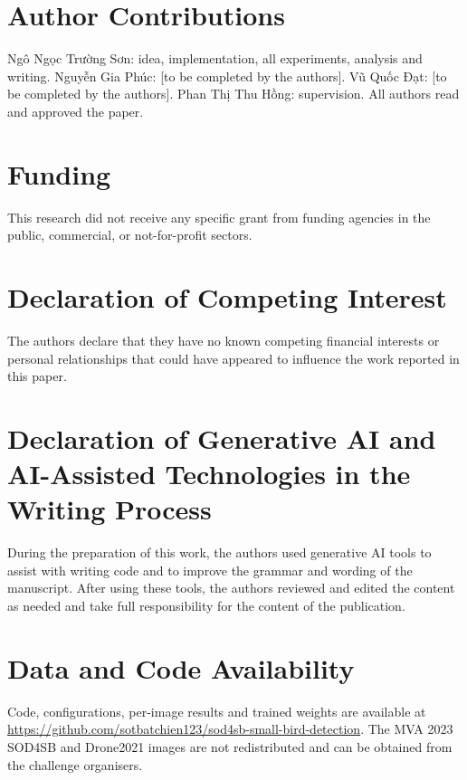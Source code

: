 \documentclass[5p,a4paper]{elsarticle}
\begin{document}
\section*{Author Contributions}
Ngô Ngọc Trường Sơn: idea, implementation, all experiments, analysis and writing. Nguyễn Gia Phúc: [to be completed
by the authors]. Vũ Quốc Đạt: [to be completed by the authors]. Phan Thị Thu Hồng: supervision. All authors read and
approved the paper.

\section*{Funding}
This research did not receive any specific grant from funding agencies in the public, commercial, or not-for-profit
sectors.

\section*{Declaration of Competing Interest}
The authors declare that they have no known competing financial interests or personal relationships that could have
appeared to influence the work reported in this paper.

\section*{Declaration of Generative AI and AI-Assisted Technologies in the Writing Process}
During the preparation of this work, the authors used generative AI tools to assist with writing code and to improve
the grammar and wording of the manuscript. After using these tools, the authors reviewed and edited the content as
needed and take full responsibility for the content of the publication.

\section*{Data and Code Availability}
Code, configurations, per-image results and trained weights are available at
\url{https://github.com/sotbatchien123/sod4sb-small-bird-detection}. The MVA 2023 SOD4SB and Drone2021 images are
not redistributed and can be obtained from the challenge organisers.



\end{document}
